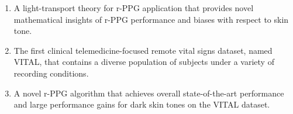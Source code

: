 \begin{enumerate}
    \item A light-transport theory for r-PPG application that provides novel mathematical insights of r-PPG performance and biases with respect to skin tone.
    \item The first clinical telemedicine-focused remote vital signs dataset, named VITAL, that contains a diverse population of subjects under a variety of recording conditions. 
    \item A novel r-PPG algorithm that achieves overall state-of-the-art performance and large performance gains for dark skin tones on the VITAL dataset.
\end{enumerate}



